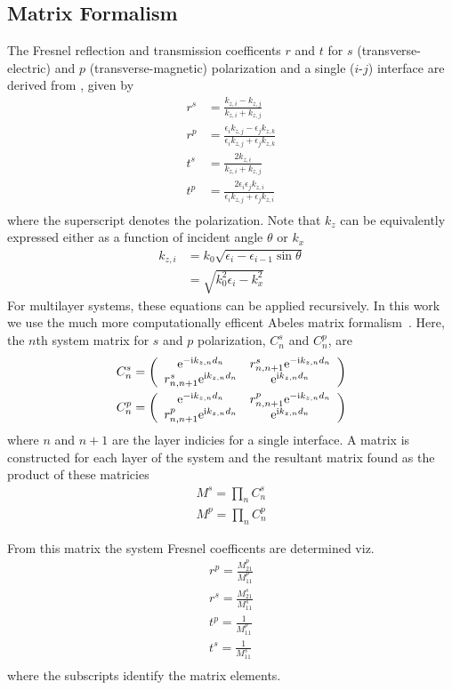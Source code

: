 \subsection{Matrix Formalism}
The Fresnel reflection and transmission coefficents $r$ and $t$ for $s$
(transverse-electric) and $p$ (transverse-magnetic) polarization and a
single ($i$-$j$) interface are derived from , given
by
\begin{align}
r^s &= \frac{k_{z,i}-k_{z,j}}{k_{z,i}+k_{z,j}}\\
r^p &= \frac{\epsilon_i k_{z,j} - \epsilon_j k_{z,k}}{\epsilon_i k_{z,j} + \epsilon_j k_{z,k}} \\
t^s &= \frac{2 k_{z,i}}{k_{z,i}+k_{z,j}}\\
t^p &= \frac{2 \epsilon_i \epsilon_j k_{z,i}}{\epsilon_i k_{z,j} + \epsilon_j k_{z,i}}\\
\end{align}
where the superscript denotes the polarization.
Note that $k_{z}$ can be equivalently expressed either as a
function of incident angle $\theta$ or $k_x$
\begin{align}
 k_{z,i} &= k_0 \sqrt{\epsilon_i - \epsilon_{i-1} \sin \theta}\\
&= \sqrt{k_0^2\epsilon_i - k_x^2}
\end{align}
For multilayer systems, these equations can be applied recursively. In 
this work we use the much more computationally efficent 
Abeles matrix formalism~\cite{abeles1948propagation}.  Here, the $n$th system matrix for $s$ and $p$
polarization, $C^s_n$ and $C^p_n$, are
\begin{align}
C^s_n = \left(\begin{array}{cc}
{\mathrm{e}}^{-{\mathrm{i}} k_{z,n} d_n} & r^s_{n,n+1} {\mathrm{e}}^{-{\mathrm{i}} k_{z,n} d_n} \\
r^s_{n,n+1} {\mathrm{e}}^{{\mathrm{i}} k_{z,n} d_n} & {\mathrm{e}}^{{\mathrm{i}} k_{z,n} d_n} 
\end{array}\right)\\
C^p_n = \left(\begin{array}{cc}
{\mathrm{e}}^{-{\mathrm{i}} k_{z,n} d_n} & r^p_{n,n+1} {\mathrm{e}}^{-{\mathrm{i}} k_{z,n} d_n} \\
r^p_{n,n+1} {\mathrm{e}}^{{\mathrm{i}} k_{z,n} d_n} & {\mathrm{e}}^{{\mathrm{i}} k_{z,n} d_n} 
\end{array}\right)
\end{align}
where $n$ and $n+1$ are the layer indicies for a single interface.  A
matrix is constructed for each layer of the system and the resultant matrix
found as the product of these matricies
\begin{align}
M^s=\prod_n C^s_n\\
M^p=\prod_n C^p_n
\end{align}

From this matrix the system Fresnel coefficents are determined viz.
\begin{align}
r^p = \frac{M^p_{21}}{M^p_{11}}\\
r^s = \frac{M^s_{21}}{M^s_{11}}\\
t^p = \frac{1}{M^p_{11}}\\
t^s = \frac{1}{M^s_{11}}\\
\end{align}
where the subscripts identify the matrix elements.

